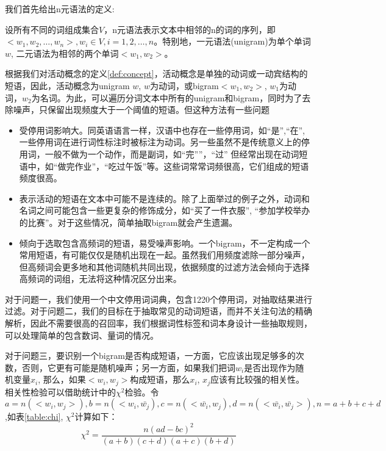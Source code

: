 我们首先给出n元语法的定义:
\begin{definition}
设所有不同的词组成集合$V$，n元语法表示文本中相邻的n的词的序列，即$<w_1, w_2, \ldots, w_n>, w_i \in V, i=1,2,\ldots,n$。特别地，一元语法(unigram)为单个单词$w$, 二元语法为相邻的两个单词$<w_1, w_2>$。
\end{definition}

根据我们对活动概念的定义\ref{def:concept}，活动概念是单独的动词或一动宾结构的短语，因此，活动概念为unigram $w$, $w$为动词，或bigram$<w_1, w_2>$, $w_1$为动词，$w_2$为名词。为此，可以遍历分词文本中所有的unigram和bigram，同时为了去除噪声，只保留出现频度大于一个阈值的短语。但这种方法有一些问题
\begin{itemize}
\item 受停用词影响大。同英语语言一样，汉语中也存在一些停用词，如``是'',``在'', 一些停用词在进行词性标注时被标注为动词。另一些虽然不是传统意义上的停用词，一般不做为一个动作，而是副词，如``完''”，``过'' 但经常出现在动词短语中，如``做完作业''，``吃过午饭''等。这些词常常词频很高，它们组成的短语频度很高。
\item 表示活动的短语在文本中可能不是连续的。除了上面举过的例子之外，动词和名词之间可能包含一些更复杂的修饰成分，如``买了一件衣服'', ``参加学校举办的比赛''。对于这些情况，简单抽取bigram就会产生遗漏。
\item 倾向于选取包含高频词的短语，易受噪声影响。一个bigram，不一定构成一个常用短语，有可能仅仅是随机出现在一起。虽然我们用频度滤除一部分噪声，但高频词会更多地和其他词随机共同出现，依据频度的过滤方法会倾向于选择高频词的词组，无法将这种情况区分出来。
\end{itemize}

对于问题一，我们使用一个中文停用词词典，包含1220个停用词，对抽取结果进行过滤。对于问题二，我们的目标在于抽取常见的动词短语，而并不关注句法的精确解析，因此不需要很高的召回率，我们根据词性标签和词本身设计一些抽取规则，可以处理简单的包含数词、量词的情况。

对于问题三，要识别一个bigram是否构成短语，一方面，它应该出现足够多的次数，否则，它更有可能是随机噪声；另一方面，如果我们把词$w_i$是否出现作为随机变量$x_i$, 那么，如果$<w_i, w_j>$构成短语，那么$x_i$, $x_j$应该有比较强的相关性。相关性检验可以借助统计中的$\chi^2$检验。令$a=n(<w_i, w_j>), b=n(<w_i, \bar{w_j}), c=n(<\bar{w_i}, w_j), d=n(<\bar{w_i}, \bar{w_j}>), n=a+b+c+d$,如表\ref{table:chi}, $\chi^2$计算如下：
\begin{equation}
\chi^2 = \frac{n(ad-bc)^2}{(a+b)(c+d)(a+c)(b+d)}
\label{eqn:chi}
\end{equation}

